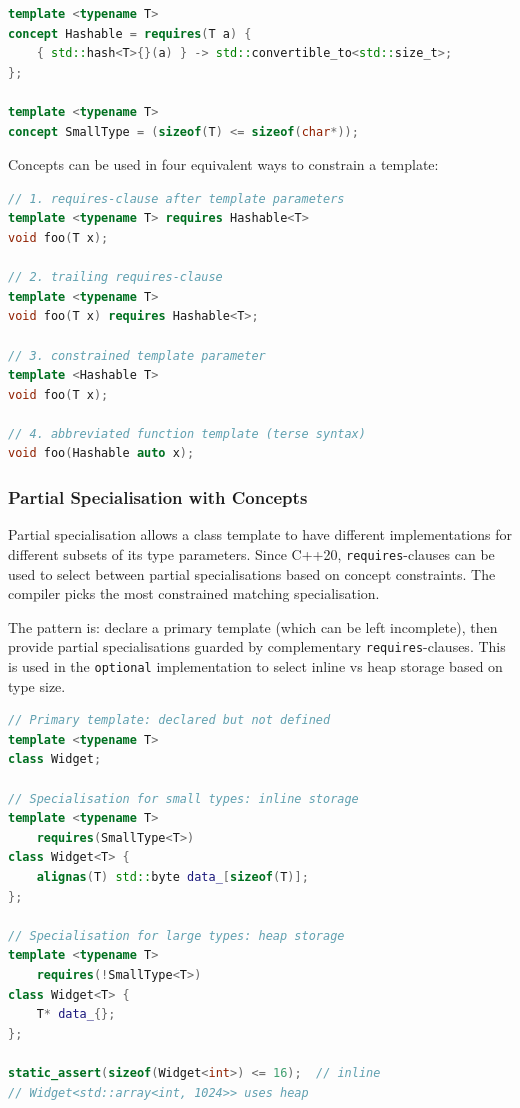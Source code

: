 \documentclass{article}
\begin{document}
\begin{lstlisting}[language=cpp,caption={Defining and using concepts}]
template <typename T>
concept Hashable = requires(T a) {
    { std::hash<T>{}(a) } -> std::convertible_to<std::size_t>;
};

template <typename T>
concept SmallType = (sizeof(T) <= sizeof(char*));
\end{lstlisting}

Concepts can be used in four equivalent ways to constrain a template:
\begin{lstlisting}[language=cpp,caption={Four ways to apply a concept}]
// 1. requires-clause after template parameters
template <typename T> requires Hashable<T>
void foo(T x);

// 2. trailing requires-clause
template <typename T>
void foo(T x) requires Hashable<T>;

// 3. constrained template parameter
template <Hashable T>
void foo(T x);

// 4. abbreviated function template (terse syntax)
void foo(Hashable auto x);
\end{lstlisting}

\subsubsection{Partial Specialisation with Concepts}
Partial specialisation allows a class template to have different implementations for different subsets of its type parameters. Since C++20, \texttt{requires}-clauses can be used to select between partial specialisations based on concept constraints. The compiler picks the most constrained matching specialisation.

The pattern is: declare a primary template (which can be left incomplete), then provide partial specialisations guarded by complementary \texttt{requires}-clauses. This is used in the \texttt{optional} implementation to select inline vs heap storage based on type size.

\begin{lstlisting}[language=cpp,caption={Constrained partial specialisation pattern}]
// Primary template: declared but not defined
template <typename T>
class Widget;

// Specialisation for small types: inline storage
template <typename T>
    requires(SmallType<T>)
class Widget<T> {
    alignas(T) std::byte data_[sizeof(T)];
};

// Specialisation for large types: heap storage
template <typename T>
    requires(!SmallType<T>)
class Widget<T> {
    T* data_{};
};

static_assert(sizeof(Widget<int>) <= 16);  // inline
// Widget<std::array<int, 1024>> uses heap
\end{lstlisting}
\end{document}
